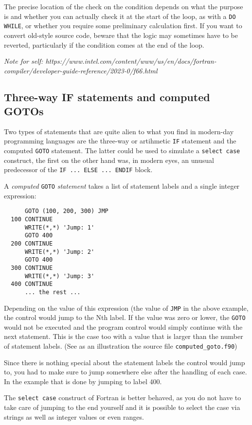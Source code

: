 The precise location of the check on the condition depends on what the purpose is and
whether you can actually check it at the start of the loop, as with a \verb+DO WHILE+,
or whether you require some preliminary calculation first. If you want to convert
old-style source code, beware that the logic may sometimes have to be reverted,
particularly if the condition comes at the end of the loop.

\emph{Note for self: https://www.intel.com/content/www/us/en/docs/fortran-compiler/developer-guide-reference/2023-0/f66.html}


\subsection{Three-way IF statements and computed GOTOs}
Two types of statements that are quite alien to what you find in modern-day programming
languages are the three-way or artihmetic \verb+IF+ statement and the computed \verb+GOTO+ statement.
The latter could be used to simulate a \verb+select case+ construct, the first on the
other hand was, in modern eyes, an unusual predecessor of the \verb+IF ... ELSE ... ENDIF+
block.

A \emph{computed} \verb+GOTO+ \emph{statement} takes a list of statement labels and a single integer expression:
%
\begin{verbatim}
      GOTO (100, 200, 300) JMP
  100 CONTINUE
      WRITE(*,*) 'Jump: 1'
      GOTO 400
  200 CONTINUE
      WRITE(*,*) 'Jump: 2'
      GOTO 400
  300 CONTINUE
      WRITE(*,*) 'Jump: 3'
  400 CONTINUE
      ... the rest ...
\end{verbatim}
%
Depending on the value of this expression (the value of \verb+JMP+ in the above example,
the control would jump to the Nth label. If the value was zero or lower, the \verb+GOTO+
would not be executed and the program control would simply continue with the next statement.
This is the case too with a value that is larger than the number of statement labels.
(See as an illustration the source file \verb+computed_goto.f90+)

Since there is nothing special about the statement labels the control would jump to, you had
to make sure to jump somewhere else after the handling of each case. In the example that
is done by jumping to label 400.

The \verb+select case+ construct of Fortran is better behaved, as you do not have to
take care of jumping to the end yourself and it is possible to select the case via strings
as well as integer values or even ranges.

